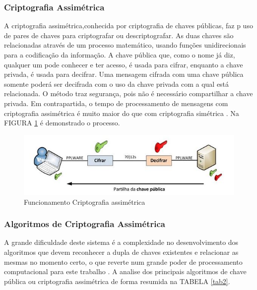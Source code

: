 \documentclass[12pt]{article}
\begin{document}
\subsubsection{Criptografia Assimétrica}

A  criptografia assimétrica,conhecida  por  criptografia de  chaves  públicas, faz p  uso  de  pares  de  chaves  para criptografar ou descriptografar. As duas chaves  são  relacionadas  através  de  um  processo  matemático, usando  funções  unidirecionais para a codificação da informação. A chave pública que, como o nome já diz, qualquer um pode conhecer e ter acesso, é usada para cifrar, enquanto a chave privada, é usada para decifrar. Uma mensagem cifrada com uma chave pública somente poderá ser decifrada com o uso da chave privada com a qual está  relacionada. O método  traz segurança, pois não é necessário compartilhar a chave privada. Em contrapartida, o tempo de processamento de mensagens com criptografia assimétrica é muito maior do que com criptografia simétrica \cite{BURNETT:02}. 
Na FIGURA \ref{cripto2} é demonstrado o processo.

 \begin{figure}[h!]
	\centering
	\includegraphics[]{assimetrica.JPG}
	\caption{Funcionamento Criptografia assimétrica}
	\label{cripto2}
\end{figure}

\subsubsection{Algoritmos de Criptografia Assimétrica}

A grande dificuldade deste sistema é a  complexidade  no  desenvolvimento  dos algoritmos que devem reconhecer a dupla de chaves existentes e relacionar as  mesmas  no  momento  certo,  o  que reverte num  grande  poder  de  processamento computacional para este trabalho \cite{STALLINGS:14}. A  analise  dos  principais  algoritmos  de  chave pública ou criptografia assimétrica de forma resumida na TABELA \ref{tab2}.
\end{document}
